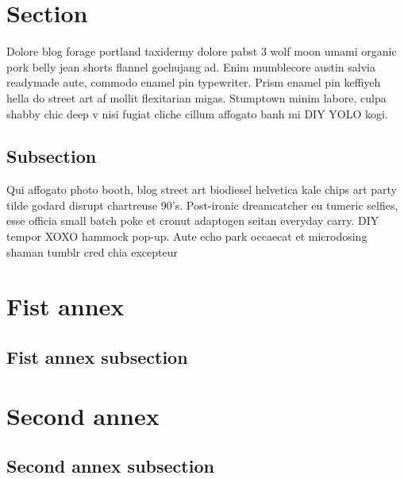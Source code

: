 \documentclass[11pt]{article}
\begin{document}




\renewcommand{\contentsname}{Table of Contents}
\renewcommand{\appendixname}{Annex}
\tableofcontents
\newpage

 \setcounter{page}{1}

\section{Section}

Dolore blog forage portland taxidermy dolore pabst 3 wolf moon umami organic pork belly jean shorts flannel gochujang ad. Enim mumblecore austin salvia readymade aute, commodo enamel pin typewriter. Prism enamel pin keffiyeh hella do street art af mollit flexitarian migas. Stumptown minim labore, culpa shabby chic deep v nisi fugiat cliche cillum affogato banh mi DIY YOLO kogi.

\subsection{Subsection}
Qui affogato photo booth, blog street art biodiesel helvetica kale chips art party tilde godard disrupt chartreuse 90's. Post-ironic dreamcatcher eu tumeric selfies, esse officia small batch poke et cronut adaptogen seitan everyday carry. DIY tempor XOXO hammock pop-up. Aute echo park occaecat et microdosing shaman tumblr cred chia excepteur



{}


\pagebreak
\begin{appendices}
    \section{Fist annex}
    \subsection{Fist annex subsection}
    \section{Second annex}
    \subsection{Second annex subsection}
\end{appendices}
\end{document}
